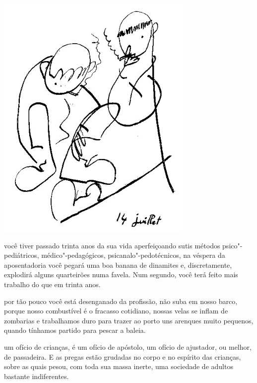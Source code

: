 \pagebreak
\thispagestyle{empty}

\begin{vplace}[.50]
\begin{center}
\includegraphics[width=95mm]{./imgs/Image_13.jpg}
\end{center}
\end{vplace}

\pagebreak
\thispagestyle{empty}


\movetooddpage


 você tiver passado trinta anos da sua vida aperfeiçoando sutis
métodos psico"-pediátricos, médico"-pedagógicos, psicanalo"-pedotécnicos,
na véspera da aposentadoria você pegará uma boa banana de dinamites e,
discretamente, explodirá alguns quarteirões numa favela. Num segundo,
você terá feito mais trabalho do que em trinta anos.

\bigskip
\bigskip

 por tão pouco você está desenganado da profissão, não suba em nosso
barco, porque nosso combustível é o fracasso cotidiano, nossas velas se
inflam de zombarias e trabalhamos duro para trazer ao porto uns arenques
muito pequenos, quando tínhamos partido para pescar a baleia.

\bigskip
\bigskip

 um ofício de crianças, é um ofício de apóstolo, um ofício de
ajustador, ou melhor, de passadeira. E as pregas estão grudadas no corpo
e no espírito das crianças, sobre as quais pesou, com toda sua massa
inerte, uma sociedade de adultos bastante indiferentes.

\pagebreak
\thispagestyle{empty}